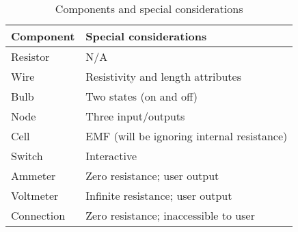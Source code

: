 \begin{table}[!h]
    \centering
    \begin{tabular}{@{}ll@{}} \toprule
        \textbf{Component} & \textbf{Special considerations} \\ \midrule 
        Resistor & N/A \\ 
        Wire & Resistivity and length attributes \\ 
        Bulb & Two states (on and off) \\ 
        Node & Three input/outputs \\ 
        Cell & EMF (will be ignoring internal resistance) \\ 
        Switch & Interactive \\ 
        Ammeter & Zero resistance; user output \\ 
        Voltmeter & Infinite resistance; user output \\ 
        Connection & Zero resistance; inaccessible to user \\ 
        \bottomrule
    \end{tabular}
    \caption{Components and special considerations}
    \label{tbl:components-list}
\end{table}